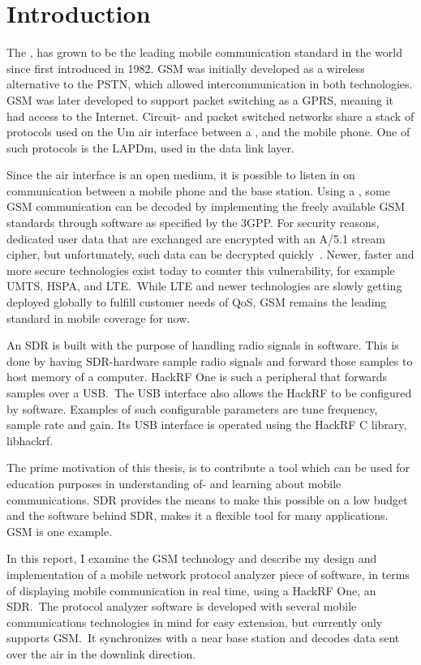 \chapter{Introduction}
The , has grown to be the leading mobile
communication standard in the world since first introduced in
1982. \gls{GSM} was initially developed as a wireless alternative to
the \gls{PSTN}, which allowed intercommunication in both
technologies. \gls{GSM} was later developed to support packet
switching as a \gls{GPRS}, meaning it had access to the
Internet. Circuit- and packet switched networks share a stack of
protocols used on the Um air interface between a ,
and the mobile phone. One of such protocols is the \gls{LAPDm}, used
in the data link layer.

Since the air interface is an open medium, it is possible to listen in
on communication between a mobile phone and the base station. Using a
, some \gls{GSM} communication can be decoded by
implementing the freely available \gls{GSM} standards through software
as specified by the \gls{3GPP}. For security reasons, dedicated user
data that are exchanged are encrypted with an A/5.1 stream cipher, but
unfortunately, such data can be decrypted
quickly~\cite{barkan}. Newer, faster and more secure technologies
exist today to counter this vulnerability, for example \gls{UMTS},
\gls{HSPA}, and \gls{LTE}.\ While \gls{LTE} and newer technologies are
slowly getting deployed globally to fulfill customer needs of
\gls{QoS}, \gls{GSM} remains the leading standard in mobile coverage
for now.

An \gls{SDR} is built with the purpose of handling radio signals in
software. This is done by having \gls{SDR}-hardware sample radio
signals and forward those samples to host memory of a computer. HackRF
One is such a peripheral that forwards samples over a \gls{USB}.\ The
\gls{USB} interface also allows the HackRF to be configured by
software. Examples of such configurable parameters are tune frequency,
sample rate and gain. Its \gls{USB} interface is operated using the
HackRF C library, libhackrf.

The prime motivation of this thesis, is to contribute a tool which can
be used for education purposes in understanding of- and learning about
mobile communications. \gls{SDR} provides the means to make this
possible on a low budget and the software behind \gls{SDR}, makes it a
flexible tool for many applications. \gls{GSM} is one example.

In this report, I examine the \gls{GSM} technology and describe my
design and implementation of a mobile network protocol analyzer piece
of software, in terms of displaying mobile communication in real time,
using a HackRF One, an \gls{SDR}.\ The protocol analyzer software is
developed with several mobile communications technologies in mind for
easy extension, but currently only supports \gls{GSM}.\ It
synchronizes with a near base station and decodes data sent over the
air in the downlink direction.

